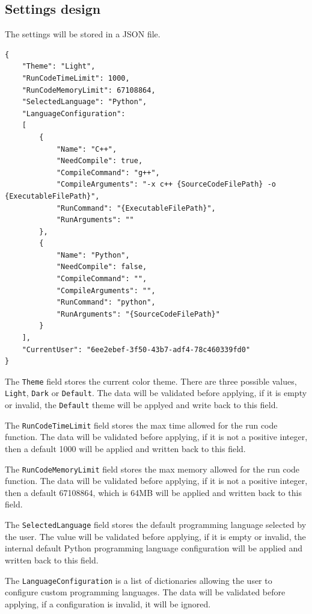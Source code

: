 \documentclass[a4paper]{report}
\newcommand{\code}{\texttt}
\begin{document}
\subsection{Settings design}

The settings will be stored in a JSON file.

\begin{verbatim}
{
    "Theme": "Light",
    "RunCodeTimeLimit": 1000,
    "RunCodeMemoryLimit": 67108864,
    "SelectedLanguage": "Python",
    "LanguageConfiguration": 
    [
        {
            "Name": "C++",
            "NeedCompile": true,
            "CompileCommand": "g++",
            "CompileArguments": "-x c++ {SourceCodeFilePath} -o {ExecutableFilePath}",
            "RunCommand": "{ExecutableFilePath}",
            "RunArguments": ""
        },
        {
            "Name": "Python",
            "NeedCompile": false,
            "CompileCommand": "",
            "CompileArguments": "",
            "RunCommand": "python",
            "RunArguments": "{SourceCodeFilePath}"
        }
    ],
    "CurrentUser": "6ee2ebef-3f50-43b7-adf4-78c460339fd0"
}
\end{verbatim}

The \code{Theme} field stores the current color theme. There are three possible values, \code{Light}, \code{Dark} or \code{Default}. The data will be validated before applying, if it is empty or invalid, the \code{Default} theme will be applyed and write back to this field.

The \code{RunCodeTimeLimit} field stores the max time allowed for the run code function. The data will be validated before applying, if it is not a positive integer, then a default 1000 will be applied and written back to this field. 

The \code{RunCodeMemoryLimit} field stores the max memory allowed for the run code function. The data will be validated before applying, if it is not a positive integer, then a default 67108864, which is 64MB will be applied and written back to this field.

The \code{SelectedLanguage} field stores the default programming language selected by the user. The value will be validated before applying, if it is empty or invalid, the internal default Python programming language configuration will be applied and written back to this field.

The \code{LanguageConfiguration} is a list of dictionaries allowing the user to configure custom programming languages. The data will be validated before applying, if a configuration is invalid, it will be ignored.
\end{document}
